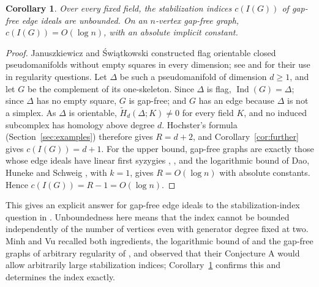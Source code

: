 \documentclass[11pt,a4paper]{article}
\newtheorem{corollary}[theorem]{Corollary}
\theoremstyle{definition}
\newcommand{\Ind}{\operatorname{Ind}}
\newcommand{\Ht}{\widetilde H}
\begin{document}
\begin{corollary}\label{cor:unbounded}
Over every fixed field, the stabilization indices $c(I(G))$ of gap-free edge ideals are unbounded. On an $n$-vertex gap-free graph, $c(I(G))=O(\log n)$, with an absolute implicit constant.
\end{corollary}
\begin{proof}
Januszkiewicz and \'{S}wi\k{a}tkowski \cite[Section 6]{JS} constructed flag orientable closed pseudomanifolds without empty squares in every dimension; see \cite{CKV} and \cite{BC} for their use in regularity questions. Let $\Delta$ be such a pseudomanifold of dimension $d\geq1$, and let $G$ be the complement of its one-skeleton. Since $\Delta$ is flag, $\Ind(G)=\Delta$; since $\Delta$ has no empty square, $G$ is gap-free; and $G$ has an edge because $\Delta$ is not a simplex. As $\Delta$ is orientable, $\Ht_d(\Delta;K)\ne0$ for every field $K$, and no induced subcomplex has homology above degree $d$. Hochster's formula (Section~\ref{sec:examples}) therefore gives $R=d+2$, and Corollary~\ref{cor:further} gives $c(I(G))=d+1$. For the upper bound, gap-free graphs are exactly those whose edge ideals have linear first syzygies \cite[Proposition 1.3]{NP}, \cite[Corollary 2.9]{DHS}, and the logarithmic bound of Dao, Huneke and Schweig \cite[Theorem 4.9]{DHS}, with $k=1$, gives $R=O(\log n)$ with absolute constants. Hence $c(I(G))=R-1=O(\log n)$.
\end{proof}
This gives an explicit answer for gap-free edge ideals to the stabilization-index question in \cite[Question 4.1]{BN}. Unboundedness here means that the index cannot be bounded independently of the number of vertices even with generator degree fixed at two. Minh and Vu \cite[pp.~338--339]{MV} recalled both ingredients, the logarithmic bound of \cite{DHS} and the gap-free graphs of arbitrary regularity of \cite{CKV}, and observed that their Conjecture A would allow arbitrarily large stabilization indices; Corollary~\ref{cor:unbounded} confirms this and determines the index exactly.
\end{document}
